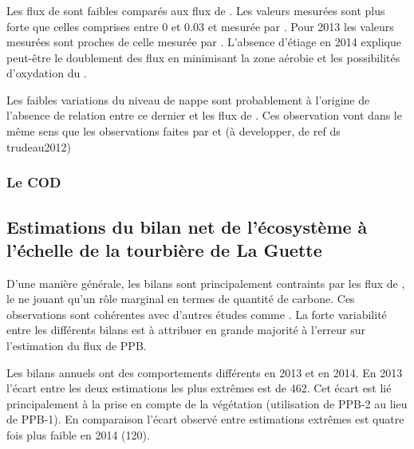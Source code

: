 \subsubsection{\fchh}

Les flux de \chh sont faibles comparés aux flux de \coo.
Les valeurs mesurées sont plus forte que celles comprises entre \num{0} et \SI{0.03}{\uml} et mesurée par \citet{bortoluzzi2006a}.
Pour 2013 les valeurs mesurées sont proches de celle mesurée par \citet{long2010}.
L'absence d'étiage en 2014 explique peut-être le doublement des flux en minimisant la zone aérobie et les possibilités d'oxydation du \chh \citep{lai2009}.

Les faibles variations du niveau de nappe sont probablement à l'origine de l'absence de relation entre ce dernier et les flux de \chh.
Ces observation vont dans le même sens que les observations faites par \citet{trudeau2012} et (à developper, de ref ds trudeau2012)


\subsubsection{Le COD}

\subsection{Estimations du bilan net de l'écosystème à l'échelle de la tourbière de La Guette}

D'une manière générale, les bilans sont principalement contraints par les flux de \coo, le \chh ne jouant qu'un rôle marginal en termes de quantité de carbone.
Ces observations sont cohérentes avec d'autres études comme \citet{bortoluzzi2006a,worrall2009}.
La forte variabilité entre les différents bilans est à attribuer en grande majorité à l'erreur sur l'estimation du flux de PPB.

Les bilans annuels ont des comportements différents en 2013 et en 2014.
En 2013 l'écart entre les deux estimations les plus extrêmes est de \SI{462}{\gcm}.
Cet écart est lié principalement à la prise en compte de la végétation (utilisation de PPB-2 au lieu de PPB-1).
En comparaison l'écart observé entre estimations extrêmes est quatre fois plus faible en 2014 (\SI{120}{\gcm}).

